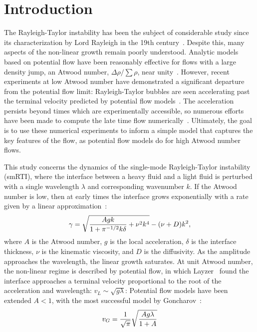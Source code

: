\section{Introduction} 

The Rayleigh-Taylor instability has been the subject of considerable study since its characterization by Lord Rayleigh in the 19th century~\cite{Rayleigh1883}.
Despite this, many aspects of the non-linear growth remain poorly understood.
Analytic models based on potential flow have been reasonably effective for flows with a large density jump, \ie an Atwood number, $\Delta \rho / \sum \rho$, near unity~\cite{Layzer1955, Layzer1955}.
However, recent experiments at low Atwood number have demonstrated a significant departure from the potential flow limit:
Rayleigh-Taylor bubbles are seen accelerating past the terminal velocity predicted by potential flow models~\cite{Wilkinson2007}.
The acceleration persists beyond times which are experimentally accessible, so numerous efforts have been made to compute the late time flow numerically~\cite{Ramaprabhu2012,Wei2012}.
Ultimately, the goal is to use these numerical experiments to inform a simple model that captures the key features of the flow, as potential flow models do for high Atwood number flows.

This study concerns the dynamics of the single-mode Rayleigh-Taylor instability (smRTI), where the interface between a heavy fluid and a light fluid is perturbed with a single wavelength $\lambda$ and corresponding wavenumber $k$.
If the Atwood number is low, then at early times the interface grows exponentially with a rate given by a linear approximation~\cite{Duff1962}:
\begin{equation} \elabel{duff0}
\gamma = \sqrt{\frac{A g k}{1 + \pi^{-1/2} k \delta} + \nu^2 k^4} - (\nu + D) k^2,
\end{equation}
where $A$ is the Atwood number,
$g$ is the local acceleration,
$\delta$ is the interface thickness,
$\nu$ is the kinematic viscosity, and
$D$ is the diffusivity.
As the amplitude approaches the wavelength, the linear growth saturates.
At unit Atwood number, the non-linear regime is described by potential flow, in which Layzer~\cite{Layzer1955} found the interface approaches a terminal velocity proportional to the root of the acceleration and wavelength: $v_L \sim \sqrt{g \lambda}$:
Potential flow models have been extended $A < 1$, with the most successful model by Goncharov~\cite{Goncharov2002}:
\begin{equation} \elabel{goncharov}
v_G = \frac{1}{\sqrt{\pi}} \sqrt{\frac{A g \lambda}{1+A}}
\end{equation}

